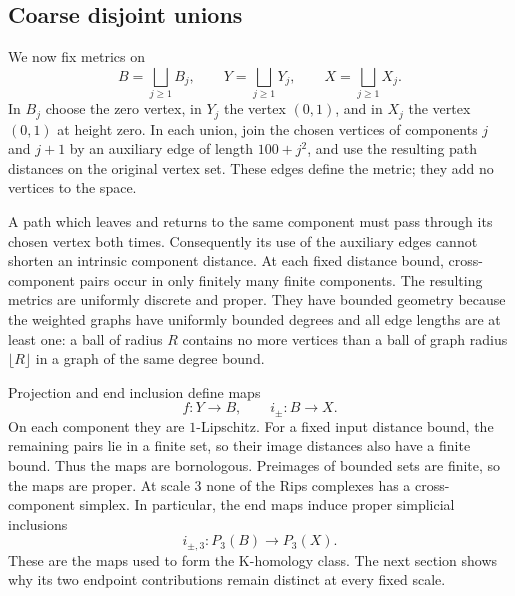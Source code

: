 \subsection{Coarse disjoint unions}

We now fix metrics on
\[
 B=\bigsqcup_{j\geq1}B_j,\qquad
 Y=\bigsqcup_{j\geq1}Y_j,\qquad
 X=\bigsqcup_{j\geq1}X_j.
\]
In $B_j$ choose the zero vertex, in $Y_j$ the vertex $(0,1)$, and in $X_j$
the vertex $(0,1)$ at height zero. In each union, join the chosen vertices
of components $j$ and $j+1$ by an auxiliary edge of length $100+j^2$, and
use the resulting path distances on the original vertex set. These edges
define the metric; they add no vertices to the space.

A path which leaves and returns to the same component must pass through
its chosen vertex both times. Consequently its use of the auxiliary edges
cannot shorten an intrinsic component distance. At each fixed distance
bound, cross-component pairs occur in only finitely many finite components.
The resulting metrics are uniformly discrete and proper. They have bounded
geometry because the weighted graphs have uniformly bounded degrees and
all edge lengths are at least one: a ball of radius $R$ contains no more
vertices than a ball of graph radius $\lfloor R\rfloor$ in a graph of the
same degree bound.

Projection and end inclusion define maps
\begin{equation}\label{geom:coarse-maps}
 f:Y\longrightarrow B,\qquad i_\pm:B\longrightarrow X.
\end{equation}
On each component they are $1$-Lipschitz. For a fixed input distance bound,
the remaining pairs lie in a finite set, so their image distances also have
a finite bound. Thus the maps are bornologous. Preimages of bounded sets
are finite, so the maps are proper. At scale $3$ none of the Rips complexes
has a cross-component simplex. In particular, the end maps induce proper
simplicial inclusions
\[
 i_{\pm,3}:P_3(B)\longrightarrow P_3(X).
\]
These are the maps used to form the K-homology class. The next section shows
why its two endpoint contributions remain distinct at every fixed scale.
